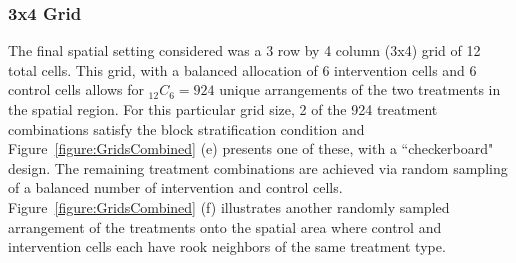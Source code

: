 \documentclass{article}[11pt]
\begin{document}

\subsubsection{3x4 Grid}

The final spatial setting considered was a 3 row by 4 column (3x4) grid of 12 total cells. This grid, with a balanced allocation of 6 intervention cells and 6 control cells allows for %
$_{12}C_{6}=924$ unique arrangements of the two treatments in the spatial region. For this particular grid size, 2 of the 924 treatment combinations satisfy the block stratification condition and Figure~\ref{figure:GridsCombined} (e) presents one of these, with a ``checkerboard" design. The remaining treatment combinations are achieved via random sampling of a balanced number of intervention and control cells. Figure~\ref{figure:GridsCombined} (f) illustrates another randomly sampled arrangement of the treatments onto the spatial area where control and intervention cells each have rook neighbors of the same treatment type.


\end{document}
